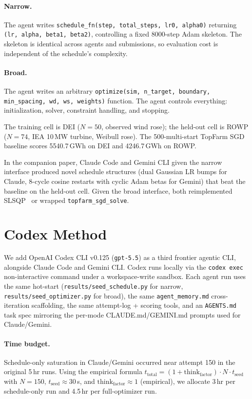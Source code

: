 \documentclass{article}
\begin{document}
\paragraph{Narrow.}
The agent writes \texttt{schedule\_fn(step, total\_steps, lr0,
alpha0)} returning \texttt{(lr, alpha, beta1, beta2)}, controlling a
fixed 8000-step Adam skeleton. The skeleton is identical across
agents and submissions, so evaluation cost is independent of the
schedule's complexity.

\paragraph{Broad.}
The agent writes an arbitrary
\texttt{optimize(sim, n\_target, boundary, min\_spacing, wd, ws,
weights)} function. The agent controls everything: initialization,
solver, constraint handling, and stopping.

The training cell is DEI ($N{=}50$, observed wind rose); the held-out
cell is ROWP ($N{=}74$, IEA 10\,MW turbine, Weibull rose). The
500-multi-start TopFarm SGD~\cite{pedersen2019topfarm} baseline
scores 5540.7\,GWh on DEI and 4246.7\,GWh on ROWP.

In the companion paper, Claude Code and Gemini CLI given the narrow
interface produced novel schedule structures (dual Gaussian LR bumps
for Claude, 8-cycle cosine restarts with cyclic Adam betas for
Gemini) that beat the baseline on the held-out cell. Given the broad
interface, both reimplemented SLSQP~\cite{kraft1988software} or
wrapped \texttt{topfarm\_sgd\_solve}.

\section{Codex Method}

We add OpenAI Codex CLI v0.125 (\texttt{gpt-5.5}) as a third
frontier agentic CLI, alongside Claude Code and Gemini CLI. Codex
runs locally via the \texttt{codex exec} non-interactive command
under a workspace-write sandbox. Each agent run uses the same
hot-start (\texttt{results/seed\_schedule.py} for narrow,
\texttt{results/seed\_optimizer.py} for broad), the same
\texttt{agent\_memory.md} cross-iteration scaffolding, the same
attempt-log + scoring tools, and an \texttt{AGENTS.md} task spec
mirroring the per-mode CLAUDE.md/GEMINI.md prompts used for
Claude/Gemini.

\paragraph{Time budget.}
Schedule-only saturation in Claude/Gemini occurred near attempt 150
in the original 5\,hr runs. Using the empirical formula
$t_\mathrm{total} = (1 + \mathrm{think}_\mathrm{factor}) \cdot N
\cdot t_\mathrm{seed}$ with $N{=}150$, $t_\mathrm{seed}\!\approx\!30$\,s,
and $\mathrm{think}_\mathrm{factor}\!\approx\!1$ (empirical), we
allocate 3\,hr per schedule-only run and 4.5\,hr per full-optimizer
run.
\end{document}
